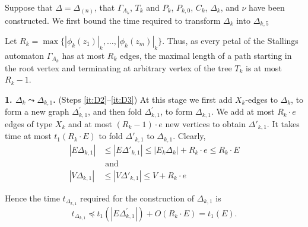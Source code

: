 \documentclass[a4paper,12pt]{article}
\newcommand{\G}{\Gamma }
\newcommand{\D}{\Delta }
\newtheorem{lemma}[theorem]{Lemma}
\numberwithin{equation}{section}
\numberwithin{figure}{section}
\begin{document}

Suppose that $\D = \D_{(n)}$,
that $\G_{A_k}$, $T_k$ and $P_k$, $P_{k,0}$,  $C_k$, $\D_k$, and $\nu$  have been
constructed. We first bound 
the time required to transform $\D_k$ into $\D_{k,5}$

Let $R_k  = \max \{ |\phi_k(z_1)|_k, \ldots, |\phi_k(z_m)|_k\}$. Thus, as
every petal of the Stallings automaton $\G_{A_k}$ has at most $R_k$
edges, the maximal length of a path starting in the root vertex
and terminating at arbitrary vertex of the tree $T_k$ is at most
$R_k-1$.

{\bf 1. $\D_k \leadsto \D_{k,1}$.}  (Steps \ref{it:D2}--\ref{it:D3}) At this stage we first add
$X_k$-edges to $\D_k$, to form a new graph $\D^\prime_{k,1}$, and then
fold $\D^\prime_{k,1}$, to form $\D_{k,1}$.  We add at most $R_k \cdot e$
edges of type $X_k$ and at most $(R_k-1)\cdot e$ new vertices to
obtain $\D'_{k,1}$. It takes time at most $t_1(R_k \cdot E )$ to fold
$\D'_{k,1}$ to  $\D_{k,1}$. Clearly,
\begin{equation}\label{evth1}
\begin{split}
|E\D_{k,1} | &\le |E\D'_{k,1} | \le |E_k\D_k | + R_k \cdot e \le
R_k \cdot E\\
&{\textrm{ and }}\\
|V \D_{k,1}| &\le |V \D'_{k,1} | \le V + R_k\cdot e
\end{split}
\end{equation}


Hence the time $t_{\D_{k,1}}$ required for the construction of $\D_{k,1}$
is
\begin{equation}\label{theta1}
t_{\D_{k,1}} \preceq t_1(|E \D_{k,1}^\prime |) + O(R_k \cdot E) =t_1( E) .
\end{equation}
\end{document}
